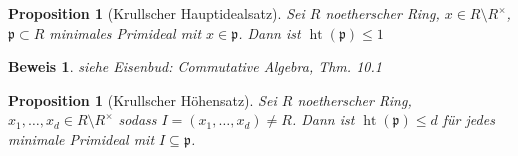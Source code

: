 \documentclass[a4paper, 12pt, numbers=noendperiod, chapterprefix=true]{scrbook}
\theoremstyle{break}
\newtheorem{Prop}[Def]{Proposition}
\theoremstyle{nonumberbreak}
\newtheorem{Bew}{Beweis}
\theoremstyle{nonumberplain}
\DeclareMathOperator{\Ht}{ht}
\newcommand{\frakp}{\mathfrak{p}}
\begin{document}
\begin{Prop}[Krullscher Hauptidealsatz]\label{prop18.11}
Sei $R$ noetherscher Ring, $x\in R\setminus R^{\times}$, $\mathfrak p\subset R$ minimales Primideal mit $x\in \mathfrak p$. Dann ist $\Ht(\frakp)\le1$
\end{Prop}

\begin{Bew}
siehe Eisenbud: Commutative Algebra, Thm. 10.1
\end{Bew}

\begin{Prop}[Krullscher H\"ohensatz]
Sei $R$ noetherscher Ring, $x_1,\ldots ,x_d\in R\setminus R^{\times}$ sodass $I=(x_1,\ldots ,x_d)\ne R$. Dann ist $\Ht(\frakp)\le d$ f\"ur jedes minimale Primideal mit $I\subseteq \frakp$.
\end{Prop}
\end{document}
